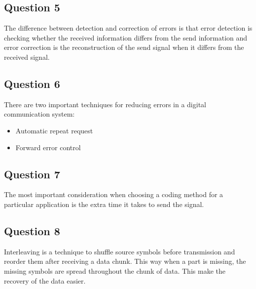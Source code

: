 \documentclass[final]{scrreprt} %
\begin{document}
\subsection{Question 5}
The difference between detection and correction of errors is that error detection is checking whether the received information differs from the send information and error correction is the reconstruction of the send signal when it differs from the received signal. 
\subsection{Question 6}
There are two important techniques for reducing errors in a digital communication system:
\begin{itemize}
\item Automatic repeat request
\item Forward error control
\end{itemize}
\subsection{Question 7}
The most important consideration when choosing a coding method for a particular application is the extra time it takes to send the signal.
\subsection{Question 8}
Interleaving is a technique to shuffle source symbols before transmission and reorder them after receiving a data chunk.
This way when a part is missing, the missing symbols are spread throughout the chunk of data.
This make the recovery of the data easier.
\end{document}

